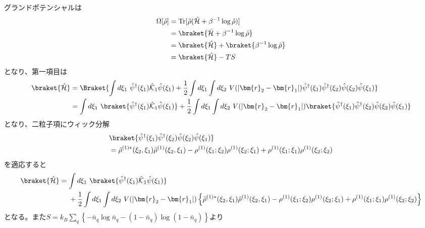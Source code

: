 \documentclass[dvipdfmx, 11pt, a4paper]{jsarticle}
\numberwithin{equation}{section}
\theoremstyle{definition}
\begin{document}
    \begin{derivationBox}
        グランドポテンシャルは
        \begin{align}
            \Omega[\hat{\rho}] &= \mathrm{Tr}[\hat{\rho}(\hat{\mathcal{H}}+\beta^{-1}\log \hat{\rho})] \notag \\
            &= \braket{\hat{\mathcal{H}}+\beta^{-1}\log \hat{\rho}} \notag \\
            &= \braket{\hat{\mathcal{H}}} + \braket{\beta^{-1}\log \hat{\rho}} \notag \\
            &= \braket{\hat{\mathcal{H}}} -TS
        \end{align}
        となり、第一項目は
        \begin{align}
            \braket{\hat{\mathcal{H}}} &= \Braket{ \int d\xi_1\ \hat{\psi}^\dagger(\xi_1) \hat{\mathcal{K}}_1 \hat{\psi}(\xi_1) +\frac{1}{2}\int d\xi_1\int d\xi_2\ V(\left| \bm{r}_2-\bm{r}_1 \right|) \hat{\psi}^\dagger(\xi_1)\hat{\psi}^\dagger(\xi_2) \hat{\psi}(\xi_2) \hat{\psi}(\xi_1) } \notag \\
            &= \int d\xi_1\ \braket{\hat{\psi}^\dagger(\xi_1) \hat{\mathcal{K}}_1 \hat{\psi}(\xi_1)} +\frac{1}{2}\int d\xi_1\int d\xi_2\ V(\left| \bm{r}_2-\bm{r}_1 \right|) \braket{\hat{\psi}^\dagger(\xi_1)\hat{\psi}^\dagger(\xi_2) \hat{\psi}(\xi_2) \hat{\psi}(\xi_1)}
        \end{align}
        となり、二粒子項にウィック分解
        \begin{align}
            &\braket{\hat{\psi}^\dagger(\xi_1)\hat{\psi}^\dagger(\xi_2)\hat{\psi}(\xi_2)\hat{\psi}(\xi_1)} \notag \\
            &= \tilde{\rho}^{(1)*}(\xi_2,\xi_1) \tilde{\rho}^{(1)}(\xi_2,\xi_1) - \rho^{(1)}(\xi_1;\xi_2) \rho^{(1)}(\xi_2;\xi_1) + \rho^{(1)}(\xi_1;\xi_1)\rho^{(1)}(\xi_2;\xi_2)
        \end{align}
        を適応すると
        \begin{align}
            \braket{\hat{\mathcal{H}}} &= \int d\xi_1\ \braket{\hat{\psi}^\dagger(\xi_1) \hat{\mathcal{K}}_1 \hat{\psi}(\xi_1)} \notag \\
            &\ \ \ \ +\frac{1}{2}\int d\xi_1\int d\xi_2\ V(\left| \bm{r}_2-\bm{r}_1 \right|) \left\{ \tilde{\rho}^{(1)*}(\xi_2,\xi_1) \tilde{\rho}^{(1)}(\xi_2,\xi_1) - \rho^{(1)}(\xi_1;\xi_2) \rho^{(1)}(\xi_2;\xi_1) + \rho^{(1)}(\xi_1;\xi_1)\rho^{(1)}(\xi_2;\xi_2) \right\}
        \end{align}
        となる。また$S = k_B \sum_q\left\{ -\bar{n}_q\log \bar{n}_q - (1-\bar{n}_q)\log(1-\bar{n}_q) \right\}$より

\end{derivationBox}
\end{document}

